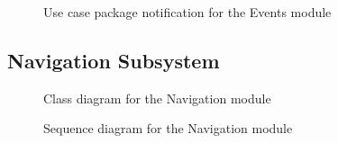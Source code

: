 \documentclass{article}
\begin{document}
			\begin{figure}[H]
				
				\caption{Use case package notification for the Events module}
				
			\end{figure}
			
		\pagebreak
	
		\subsection{Navigation Subsystem}
		
			\begin{figure}[H]
				
				\caption{Class diagram for the Navigation module}
				
			\end{figure}
		
			\begin{figure}[H]
				
				\caption{Sequence diagram for the Navigation module}
				
			\end{figure}		
			
\end{document}
